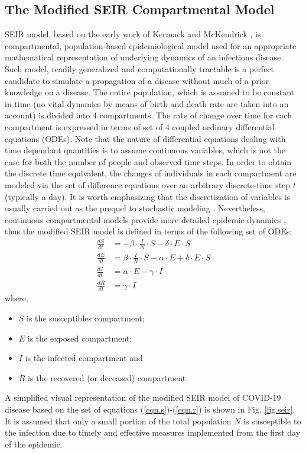 \documentclass[conference]{IEEEtran}
\begin{document}
\subsection{The Modified SEIR Compartmental Model}
\label{sec.modeling.seir}
SEIR model, based on the early work of Kermack and McKendrick \cite{Kermack1991_1,Kermack1991_2,Kermack1991_3}, is compartmental, population-based epidemiological model used for an appropriate mathematical representation of underlying dynamics of an infectious disease. Such model, readily generalized and computationally tractable is a perfect candidate to simulate a propagation of a disease without much of a prior knowledge on a disease. 
The entire population, which is assumed to be constant in time (no vital dynamics by means of birth and death rate are taken into an account) is divided into 4 compartments. The rate of change over time for each compartment is expressed in terms of set of 4 coupled ordinary differential equations (ODEs). 
Note that the nature of differential equations dealing with time dependant quantities is to assume continuous variables, which is not the case for both the number of people and observed time steps. 
In order to obtain the discrete time equivalent, the changes of individuals in each compartment are modeled via the set of difference equations over an arbitrary discrete-time step $t$ (typically a day). It is worth emphasizing that the discretization of variables is usually carried out as the prequel to stochastic modeling \cite{canto_2015}. Nevertheless, continuous compartmental models provide more detailed epidemic dynamics \cite{Peng2020}, thus the modified SEIR model is defined in terms of the following set of ODEs:
\begin{align}
    \label{eqn.s}
    \frac{dS}{dt} &= - \beta \cdot \frac{I}{N} \cdot S - \delta \cdot E \cdot S \\
    \label{eqn.e}
    \frac{dE}{dt} &= \beta \cdot \frac{I}{N} \cdot S - \alpha \cdot E + \delta \cdot E \cdot S \\
    \label{eqn.i}
    \frac{dI}{dt} &= \alpha \cdot E - \gamma \cdot I \\
    \label{eqn.r}
    \frac{dR}{dt} &= \gamma \cdot I
\end{align}
where,
\begin{itemize}
    \item $S$ is the susceptibles compartment;
    \item $E$ is the exposed compartment;
    \item $I$ is the infected compartment and
    \item $R$ is the recovered (or deceased) compartment.
\end{itemize}
A simplified visual representation of the modified SEIR model of COVID-19 disease based on the set of equations (\ref{eqn.s})-(\ref{eqn.r}) is shown in Fig. \ref{fig.seir}. It is assumed that only a small portion of the total population $N$ is susceptible to the infection due to timely and effective measures implemented from the first day of the epidemic.
\end{document}
